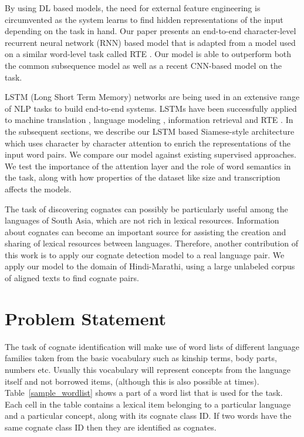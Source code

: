 \documentclass[11pt,letterpaper]{article}
\begin{document}

By using DL based models, the need for external feature engineering is circumvented as the system learns to find hidden representations of the input depending on the task in hand. Our paper presents an end-to-end character-level recurrent neural network (RNN) based model that is adapted from a model used on a similar word-level task called RTE \cite{rocktaschel2016reasoning}. Our model is able to outperform both the common subsequence model \cite{rama2015automatic} as well as a recent CNN-based model \cite{rama2016siamese} on the task. 

LSTM (Long Short Term Memory) networks are being used in an extensive range of NLP tasks to build end-to-end systems. LSTMs have been successfully applied to machine translation \cite{bahdanau2014neural}, language modeling \cite{mikolov2010recurrent}, information retrieval \cite{sordoni2015hierarchical} and RTE \cite{snli:emnlp2015}. In the subsequent sections, we describe our LSTM based Siamese-style architecture which uses character by character attention to enrich the representations of the input word pairs. We compare our model against existing supervised approaches. We test the importance of the attention layer and the role of word semantics in the task, along with how properties of the dataset like size and transcription affects the models.

The task of discovering cognates can possibly be particularly useful among the languages of South Asia, which are not rich in lexical resources. Information about cognates can become an important source for assisting the creation and sharing of lexical resources between languages. Therefore, another contribution of this work is to apply our cognate detection model to a real language pair. We apply our model to the domain of Hindi-Marathi, using a large unlabeled corpus of aligned texts to find cognate pairs.

\section{Problem Statement}

The task of cognate identification will make use of word lists of different language families taken from the basic vocabulary such as kinship terms, body parts, numbers etc. Usually this vocabulary will represent concepts from the language itself and not borrowed items, (although this is also possible at times). Table~\ref{sample_wordlist} shows a part of a word list that is used for the task. Each cell in the table contains a lexical item belonging to a particular language and a particular concept, along with its cognate class ID. If two words have the same cognate class ID then they are identified as cognates.
\end{document}
